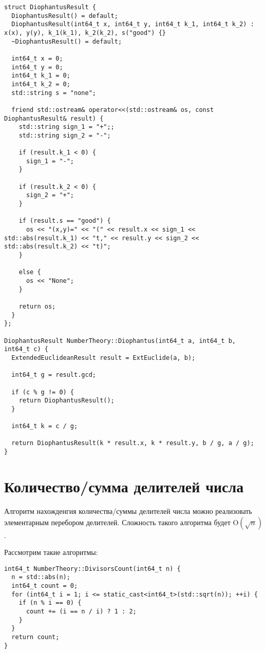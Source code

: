 \documentclass[12pt, a4paper, openany]{book}
\begin{document}
\begin{lstlisting}[breaklines=true]
struct DiophantusResult {
  DiophantusResult() = default;
  DiophantusResult(int64_t x, int64_t y, int64_t k_1, int64_t k_2) : x(x), y(y), k_1(k_1), k_2(k_2), s("good") {}
  ~DiophantusResult() = default;

  int64_t x = 0;
  int64_t y = 0;
  int64_t k_1 = 0;
  int64_t k_2 = 0;
  std::string s = "none";

  friend std::ostream& operator<<(std::ostream& os, const DiophantusResult& result) {
    std::string sign_1 = "+";;
    std::string sign_2 = "-";

    if (result.k_1 < 0) {
      sign_1 = "-";
    }

    if (result.k_2 < 0) {
      sign_2 = "+";
    }

    if (result.s == "good") {
      os << "(x,y)=" << "(" << result.x << sign_1 << std::abs(result.k_1) << "t," << result.y << sign_2 << std::abs(result.k_2) << "t)";
    }

    else {
      os << "None";
    }

    return os;
  }
};

DiophantusResult NumberTheory::Diophantus(int64_t a, int64_t b, int64_t c) {
  ExtendedEuclideanResult result = ExtEuclide(a, b);

  int64_t g = result.gcd;

  if (c % g != 0) {
    return DiophantusResult(); 
  }

  int64_t k = c / g;

  return DiophantusResult(k * result.x, k * result.y, b / g, a / g);
}
\end{lstlisting}

\section{Количество/сумма делителей числа}

Алгоритм нахожденгия количества/суммы делителей числа можно реализовать элементарным перебором делителей. Сложность такого алгоритма будет $\text{O}(\sqrt{n})$. 

\noindent
Рассмотрим такие алгоритмы:

\begin{lstlisting}[breaklines=true]
int64_t NumberTheory::DivisorsCount(int64_t n) {
  n = std::abs(n);
  int64_t count = 0;
  for (int64_t i = 1; i <= static_cast<int64_t>(std::sqrt(n)); ++i) {
    if (n % i == 0) {
      count += (i == n / i) ? 1 : 2;
    }
  }
  return count;
}
\end{lstlisting}
\end{document}
